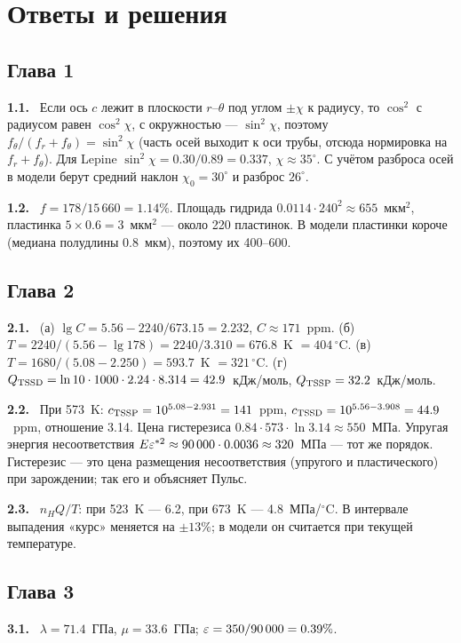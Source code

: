 \chapter{Ответы и решения}\label{app:answers}

\newcommand{\ans}[1]{\par\smallskip\noindent\textbf{\color{hydr}#1.}\ }

\section*{Глава 1}
\ans{1.1} Если ось $c$ лежит в плоскости $r$--$\theta$ под углом $\pm\chi$ к радиусу, то
$\cos^2$ с радиусом равен $\cos^2\chi$, с окружностью --- $\sin^2\chi$, поэтому
$f_\theta/(f_r+f_\theta)=\sin^2\chi$ (часть осей выходит к оси трубы, отсюда нормировка на
$f_r+f_\theta$). Для Lepine $\sin^2\chi=0.30/0.89=0.337$, $\chi\approx35^\circ$. С учётом разброса
осей в модели берут средний наклон $\chi_0=30^\circ$ и разброс $26^\circ$.

\ans{1.2} $f=178/15\,660=1.14\%$. Площадь гидрида $0.0114\cdot240^2\approx655$~мкм$^2$, пластинка
$5\times0.6=3$~мкм$^2$ --- около 220 пластинок. В модели пластинки короче (медиана полудлины 0.8~мкм),
поэтому их 400--600.

\section*{Глава 2}
\ans{2.1} (а) $\lg C=5.56-2240/673.15=2.232$, $C\approx171$~ppm. (б) $T=2240/(5.56-\lg178)=2240/3.310=676.8$~K
$=404\,^\circ$C. (в) $T=1680/(5.08-2.250)=593.7$~K $=321\,^\circ$C. (г) $Q_{\mathrm{TSSD}}=\ln10\cdot1000\cdot2.24\cdot8.314=42.9$~кДж/моль,
$Q_{\mathrm{TSSP}}=32.2$~кДж/моль.

\ans{2.2} При 573~K: $c_{\mathrm{TSSP}}=10^{5.08-2.931}=141$~ppm, $c_{\mathrm{TSSD}}=10^{5.56-3.908}=44.9$~ppm, отношение 3.14.
Цена гистерезиса $0.84\cdot573\cdot\ln3.14\approx550$~МПа. Упругая энергия несоответствия
$E\varepsilon^{*2}\approx90\,000\cdot0.0036\approx320$~МПа --- тот же порядок. Гистерезис --- это цена
размещения несоответствия (упругого и пластического) при зарождении; так его и объясняет Пульс.

\ans{2.3} $n_HQ/T$: при 523~K --- 6.2, при 673~K --- 4.8~МПа/$^\circ$C. В интервале выпадения «курс»
меняется на $\pm13\%$; в модели он считается при текущей температуре.

\section*{Глава 3}
\ans{3.1} $\lambda=71.4$~ГПа, $\mu=33.6$~ГПа; $\varepsilon=350/90\,000=0.39\%$.

